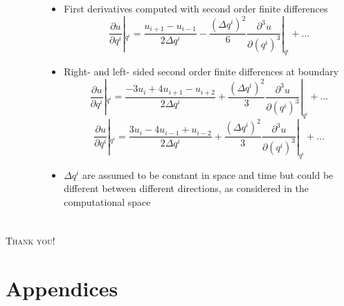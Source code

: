 \documentclass[first,firstsupp,lastsupp,handout,last,hyperref,table]{ETHclass}
\begin{document}
\begin{frame}[label=diffgeom]
\begin{columns}
\begin{column}{0.3\textwidth}
\begin{figure}[!h]
  \end{figure}
    \vspace{-1cm}
\hyperlink{diffgeom_details}{}
\end{column}
\begin{column}{0.7\textwidth}
{\scriptsize
\begin{itemize}
\item First derivatives computed with second order finite differences
\begin{equation*}
\frac{\partial u}{\partial q^{i}}|_{q^{i}}=\frac{u_{i+1}-u_{i-1}}{2\Delta q^{i}}-\frac{(\Delta q^{i})^{2}}{6}\frac{\partial^{3} u}{\partial (q^{i})^{3}}|_{q^{i}}+\dots
\end{equation*}
\item Right- and left- sided second order finite differences at boundary
\begin{equation*}
\frac{\partial u}{\partial q^{i}}|_{q^{i}}=\frac{-3u_{i}+4u_{i+1}-u_{i+2}}{2\Delta q^{i}}+\frac{(\Delta q^{i})^{2}}{3}\frac{\partial^{3} u}{\partial (q^{i})^{3}}|_{q^{i}}+\dots
\end{equation*}
\begin{equation*}
\frac{\partial u}{\partial q^{i}}|_{q^{i}}=\frac{3u_{i}-4u_{i-1}+u_{i-2}}{2\Delta q^{i}}+\frac{(\Delta q^{i})^{2}}{3}\frac{\partial^{3} u}{\partial (q^{i})^{3}}|_{q^{i}}+\dots
\end{equation*}
\item $\Delta q^{i}$ are assumed to be constant in space and time but could be different between different directions, as considered in the computational space
\end{itemize}
}
\end{column}
\end{columns}
\end{frame}

\begin{frame}[plain]
\frametitle{}
\vspace{1cm}
\centering
{\LARGE
\textsc{Thank you!}
}
\end{frame}

\section{Appendices}
\end{document}
